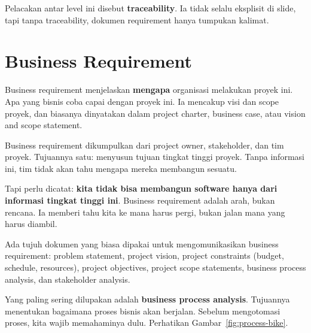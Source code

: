 \documentclass[11pt,a4paper]{article}
\begin{document}
Pelacakan antar level ini disebut \textbf{traceability}. Ia tidak selalu eksplisit di slide, tapi tanpa traceability, dokumen requirement hanya tumpukan kalimat.

\section{Business Requirement}

Business requirement menjelaskan \textbf{mengapa} organisasi melakukan proyek ini. Apa yang bisnis coba capai dengan proyek ini. Ia mencakup visi dan scope proyek, dan biasanya dinyatakan dalam project charter, business case, atau vision and scope statement.

Business requirement dikumpulkan dari project owner, stakeholder, dan tim proyek. Tujuannya satu: menyusun tujuan tingkat tinggi proyek. Tanpa informasi ini, tim tidak akan tahu mengapa mereka membangun sesuatu.

Tapi perlu dicatat: \textbf{kita tidak bisa membangun software hanya dari informasi tingkat tinggi ini}. Business requirement adalah arah, bukan rencana. Ia memberi tahu kita ke mana harus pergi, bukan jalan mana yang harus diambil.

Ada tujuh dokumen yang biasa dipakai untuk mengomunikasikan business requirement: problem statement, project vision, project constraints (budget, schedule, resources), project objectives, project scope statements, business process analysis, dan stakeholder analysis.

Yang paling sering dilupakan adalah \textbf{business process analysis}. Tujuannya menentukan bagaimana proses bisnis akan berjalan. Sebelum mengotomasi proses, kita wajib memahaminya dulu. Perhatikan Gambar~\ref{fig:process-bike}.
\end{document}
